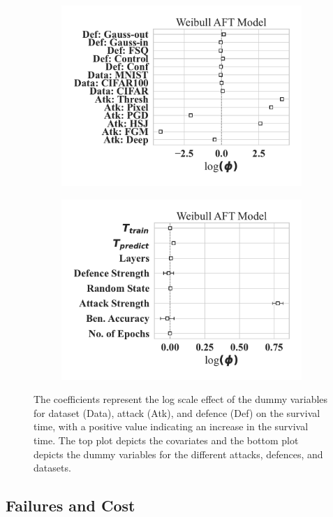 \begin{figure}
    \centering
	\begin{subfigure}
	\centering
    \includegraphics[width=.37\textwidth,trim={25pt 20pt 20pt 10pt},clip]{plots/weibull_aft_dummies.pdf}
    \end{subfigure}
    \begin{subfigure}
	\centering
    \includegraphics[width=.37\textwidth,trim={25pt 20pt 20pt 10pt},clip]{plots/weibull_aft.pdf}
    \end{subfigure}
    \caption{The coefficients represent the log scale effect of the dummy variables for dataset (Data), attack (Atk), and defence (Def) on the survival time, with a positive value indicating an increase in the survival time. The top plot depicts the covariates and the bottom plot depicts the dummy variables for the different attacks, defences, and datasets.}
    \label{fig:covariates}
    \label{fig:dummies}
\end{figure}


\subsection{Failures and Cost}

